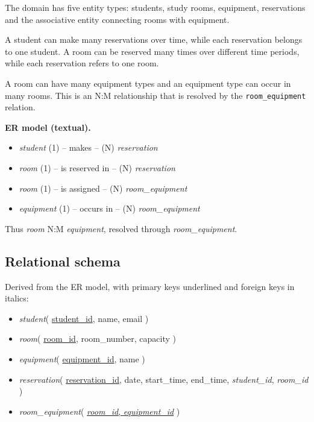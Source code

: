\documentclass[10pt,a4paper]{article}
\begin{document}
	The domain has five entity types: students, study rooms, equipment,
	reservations and the associative entity connecting rooms with
	equipment.
	
	A student can make many reservations over time, while each
	reservation belongs to one student. A room can be reserved many
	times over different time periods, while each reservation refers to
	one room.
	
	A room can have many equipment types and an equipment type can occur
	in many rooms. This is an N:M relationship that is resolved by the
	\texttt{room\_equipment} relation.
	
	\begin{greenbox}
		
		\textbf{ER model (textual).}
		
		\begin{itemize}[leftmargin=5mm,itemsep=1pt]
			\item \textit{student} (1) -- makes -- (N) \textit{reservation}
			\item \textit{room} (1) -- is reserved in -- (N) \textit{reservation}
			\item \textit{room} (1) -- is assigned -- (N) \textit{room\_equipment}
			\item \textit{equipment} (1) -- occurs in -- (N) \textit{room\_equipment}
		\end{itemize}
		
		Thus \textit{room} N:M \textit{equipment}, resolved through
		\textit{room\_equipment}.
		
	\end{greenbox}
	
	
	
	\subsection{Relational schema}
	
	Derived from the ER model, with primary keys underlined and foreign
	keys in italics:
	
	\begin{itemize}[leftmargin=6mm,itemsep=3pt]
		
		\item
		\textit{student}(
		\underline{student\_id},
		name,
		email
		)
		
		\item
		\textit{room}(
		\underline{room\_id},
		room\_number,
		capacity
		)
		
		\item
		\textit{equipment}(
		\underline{equipment\_id},
		name
		)
		
		\item
		\textit{reservation}(
		\underline{reservation\_id},
		date,
		start\_time,
		end\_time,
		\textit{student\_id},
		\textit{room\_id}
		)
		
		\item
		\textit{room\_equipment}(
		\underline{\textit{room\_id}, \textit{equipment\_id}}
		)
		
	\end{itemize}
	
\end{document}
